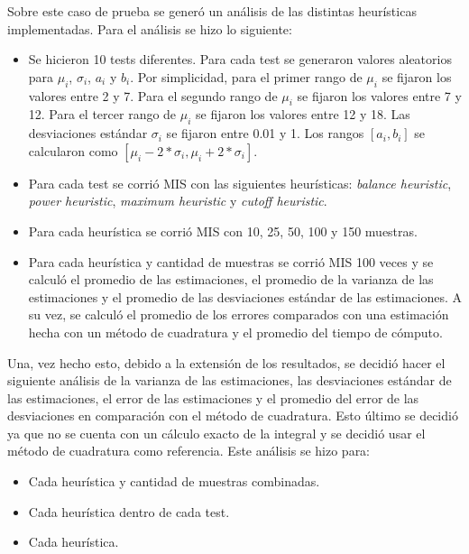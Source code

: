 \documentclass{article}
\begin{document}
Sobre este caso de prueba se generó un análisis de las distintas heurísticas implementadas.
Para el análisis se hizo lo siguiente:
\begin{itemize}
    \item Se hicieron 10 tests diferentes. Para cada test se generaron valores aleatorios para \( \mu_{i} \), \( \sigma_{i} \), \( a_{i} \) y \( b_{i} \).
          Por simplicidad, para el primer rango de  \( \mu_{i} \) se fijaron los valores entre 2 y 7.
          Para el segundo rango de \( \mu_{i} \) se fijaron los valores entre 7 y 12.
          Para el tercer rango de \( \mu_{i} \) se fijaron los valores entre 12 y 18.
          Las desviaciones estándar \( \sigma_{i} \) se fijaron entre 0.01 y 1.
          Los rangos \( [a_{i}, b_{i}] \) se calcularon como \( [ \mu_{i} - 2 * \sigma_{i}, \mu_{i} + 2 * \sigma_{i} ] \).
    \item Para cada test se corrió MIS con las siguientes heurísticas: \textit{balance heuristic}, \textit{power heuristic}, \textit{maximum heuristic} y \textit{cutoff heuristic}.
    \item Para cada heurística se corrió MIS con 10, 25, 50, 100 y 150 muestras.
    \item Para cada heurística y cantidad de muestras se corrió MIS 100 veces y se calculó el promedio de las estimaciones,
          el promedio de la varianza de las estimaciones y el promedio de las desviaciones estándar de las estimaciones.
          A su vez, se calculó el promedio de los errores comparados con una estimación hecha con un método de cuadratura y el promedio del tiempo de cómputo.
\end{itemize}

Una, vez hecho esto, debido a la extensión de los resultados, se decidió hacer el siguiente análisis de la varianza de las estimaciones, las desviaciones estándar de las estimaciones, el error de las estimaciones y el promedio del error de las desviaciones en comparación con el método de cuadratura.
Esto último se decidió ya que no se cuenta con un cálculo exacto de la integral y se decidió usar el método de cuadratura como referencia.
Este análisis se hizo para:

\begin{itemize}
    \item Cada heurística y cantidad de muestras combinadas.
    \item Cada heurística dentro de cada test.
    \item Cada heurística.
\end{itemize}
\end{document}
